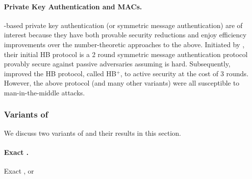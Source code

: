 \paragraph{Private Key Authentication and MACs.} \LPN-based private key authentication (or symmetric message authentication) are of interest because they have both provable security reductions and enjoy efficiency improvements over the number-theoretic approaches to the above.
Initiated by \cite{AC:HopBlu01}, their initial HB protocol is a 2 round symmetric message authentication protocol provably secure against passive adversaries assuming \LPN is hard.
Subsequently, \cite{C:JueWei05} improved the HB protocol, called HB$^+$, to active security at the cost of 3 rounds. 
However, the above protocol (and many other variants) were all susceptible to man-in-the-middle attacks.





\subsubsection{Variants of \LPN}
We discuss two variants of \LPN and their results in this section.

\paragraph{Exact \LPN.} Exact \LPN, or \XLPN










